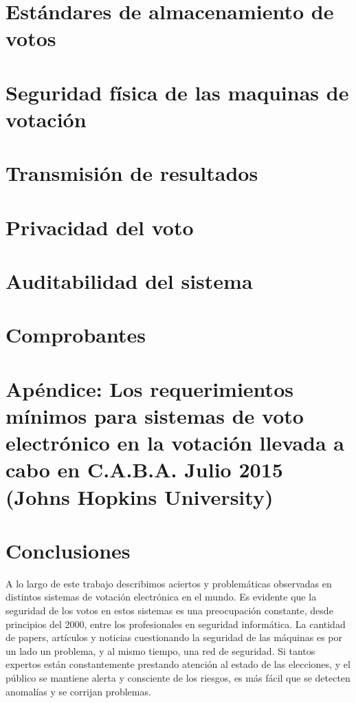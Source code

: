 \documentclass[11pt]{article}
\begin{document}
\pagebreak
\section{Estándares de almacenamiento de votos}


\pagebreak
\section{Seguridad física de las maquinas de votación}


\pagebreak
\section{Transmisión de resultados}


\pagebreak
\section{Privacidad del voto}



\pagebreak
\section{Auditabilidad del sistema}


\pagebreak
\section{Comprobantes}


\pagebreak
\section{Apéndice: Los requerimientos mínimos para sistemas de voto electrónico en la votación llevada a cabo en C.A.B.A. Julio 2015 (Johns Hopkins University)}\cite{hopkins}


\pagebreak
\section{Conclusiones}
A lo largo de este trabajo describimos aciertos y problemáticas observadas en distintos sistemas de votación electrónica en el mundo. Es evidente que la seguridad de los votos en estos sistemas es una preocupación constante, desde principios del 2000, entre los profesionales en seguridad informática. La cantidad de papers, artículos y noticias cuestionando la seguridad de las máquinas es por un lado un problema, y al mismo tiempo, una red de seguridad. Si tantos expertos están constantemente prestando atención al estado de las elecciones, y el público se mantiene alerta y consciente de los riesgos, es más fácil que se detecten anomalías y se corrijan problemas.
\end{document}
